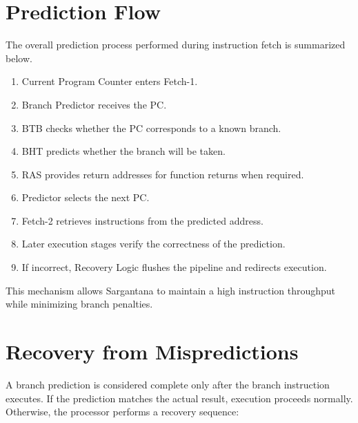 \begin{rtlrefs}
\end{rtlrefs}

\section{Prediction Flow}

The overall prediction process performed during instruction fetch is summarized below.

\begin{enumerate}
  \item Current Program Counter enters Fetch-1.
  \item Branch Predictor receives the PC.
  \item BTB checks whether the PC corresponds to a known branch.
  \item BHT predicts whether the branch will be taken.
  \item RAS provides return addresses for function returns when required.
  \item Predictor selects the next PC.
  \item Fetch-2 retrieves instructions from the predicted address.
  \item Later execution stages verify the correctness of the prediction.
  \item If incorrect, Recovery Logic flushes the pipeline and redirects execution.
\end{enumerate}

This mechanism allows Sargantana to maintain a high instruction throughput while minimizing
branch penalties.

\begin{rtlrefs}
\end{rtlrefs}

\section{Recovery from Mispredictions}

A branch prediction is considered complete only after the branch instruction executes.
If the prediction matches the actual result, execution proceeds normally.
Otherwise, the processor performs a recovery sequence:

